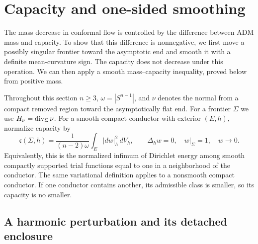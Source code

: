 \section{Capacity and one-sided smoothing}
\label{sec:rpi:orientation}

The mass decrease in conformal flow is controlled by the difference
between ADM mass and capacity. To show that this difference is
nonnegative, we first move a possibly singular frontier toward the
asymptotic end and smooth it with a definite mean-curvature sign.
The capacity does not decrease under this operation. We can then apply a
smooth mass--capacity inequality, proved below from positive mass.

Throughout this section $n\ge3$, $\omega=|S^{n-1}|$, and $\nu$
denotes the normal from a compact removed region toward the
asymptotically flat end. For a frontier $\Sigma$ we use
$H_\nu=\operatorname{div}_\Sigma\nu$.
For a smooth compact conductor with exterior $(E,h)$, normalize
capacity by
\begin{equation}\label{eq:rpi:capacity}
 \mathfrak c(\Sigma,h)=\frac1{(n-2)\omega}
             \int_E|dw|_h^2\,dV_h,
 \qquad \Delta_h w=0,\quad w|_\Sigma=1,\quad w\to0.
\end{equation}
Equivalently, this is the normalized infimum of Dirichlet energy
among smooth compactly supported trial functions equal to one in a
neighborhood of the conductor. The same variational definition
applies to a nonsmooth compact conductor.
If one conductor contains another, its admissible class is smaller,
so its capacity is no smaller.

\subsection{A harmonic perturbation and its detached enclosure}

